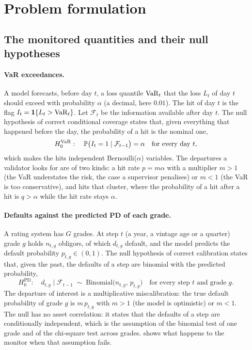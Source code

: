 \section{Problem formulation}
\label{sec:problem}

\subsection{The monitored quantities and their null hypotheses}
\label{sec:problem-quantities}

\paragraph{VaR exceedances.}
A model forecasts, before day $t$, a loss quantile $\operatorname{VaR}_t$ that the loss $L_t$ of day $t$ should exceed with probability $\alpha$ (a decimal, here $0.01$). The hit of day $t$ is the flag
$I_t=\mathbf{1}\{L_t>\operatorname{VaR}_t\}$. Let $\mathcal F_t$ be the information available after day $t$. The null hypothesis of correct conditional coverage states that, given everything that happened before the
day, the probability of a hit is the nominal one,
\begin{equation}
H_0^{\mathrm{VaR}}:\quad \mathbb{P}\bigl(I_t=1\mid\mathcal F_{t-1}\bigr)=\alpha\quad\text{for every day }t,
\label{eq:null-var}
\end{equation}
which makes the hits independent Bernoulli($\alpha$) variables. The departures a validator looks for are of two kinds: a hit rate $p=m\alpha$ with a multiplier $m>1$ (the VaR understates the risk,
the case a supervisor penalises) or $m<1$ (the VaR is too conservative), and hits that cluster, where the probability of a hit after a hit is $q>\alpha$ while the hit rate stays $\alpha$.

\paragraph{Defaults against the predicted PD of each grade.}
A rating system has $G$ grades. At step $t$ (a year, a vintage age or a quarter) grade $g$ holds $n_{t,g}$ obligors, of which $d_{t,g}$ default, and the model predicts the default probability $p_{t,g}\in(0,1)$. The
null hypothesis of correct calibration states that, given the past, the defaults of a step are binomial with the predicted probability,
\begin{equation}
H_0^{\mathrm{PD}}:\quad d_{t,g}\mid\mathcal F_{t-1}\;\sim\;\mathrm{Binomial}\bigl(n_{t,g},\,p_{t,g}\bigr)\quad\text{for every step }t\text{ and grade }g.
\label{eq:null-pd}
\end{equation}
The departure of interest is a multiplicative miscalibration: the true default probability of grade $g$ is $m\,p_{t,g}$ with $m>1$ (the model is optimistic) or $m<1$. The null has no asset correlation: it
states that the defaults of a step are conditionally independent, which is the assumption of the binomial test of one grade and of the chi-square test across grades.  shows what happens to
the monitor when that assumption fails.

